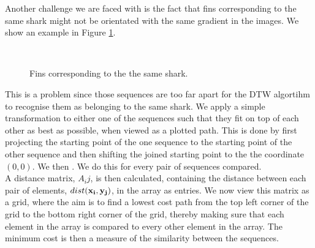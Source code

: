 \documentclass[a4paper,10pt]{article}
\begin{document}
Another challenge we are faced with is the fact that fins corresponding to the 
same shark might not be orientated with the same gradient in the images.  
We show an example in Figure \ref{gradient}.  \\
 
\begin{figure}[H]
\centering
\mbox{ \quad
{}}
\caption{Fins corresponding to the the same shark.}
\label{gradient}
\end{figure}

This is a problem since those sequences are too far apart for the DTW algortihm
to recognise them as belonging to the same shark.  We apply a simple
transformation to either one of the sequences such that they fit on top of each other
as best as possible, when viewed as a plotted path.  This is done by first projecting the starting
point of the one sequence to the starting point of the other sequence and then shifting the joined starting
point to the the coordinate $(0, 0)$.
We then .
We do this for every pair of sequences compared.  \\
 
A distance matrix, $A_ij$, is then calculated, containing the distance between
each pair of elements,  $dist(\bf{x}_i, \bf{y}_j)$, in the array as entries.
We now view this matrix as a
grid, where the
aim is to find a lowest cost path from the top left corner of the grid to the bottom right
corner of the grid, thereby making sure that each element in the array is compared to every other element in the array.
The minimum cost is then a measure of the similarity between the
sequences.  \\
\end{document}
